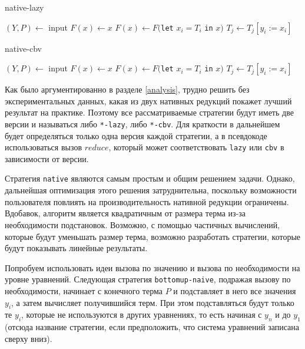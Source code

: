 \documentclass[../diploma.tex]{subfiles}
\begin{document}
\begin{megaalgorithm}
    \caption{native-lazy}
  \begin{algorithmic}
    \State $(Y, P)\gets$ input
    \State $F(x) \gets x$
        \State $F(x) \gets F($\texttt{let} $x_i = T_i$ \texttt{in} $x)$
            \State $T_j \gets T_j[y_i := x_i]$
        \EndFor
    \EndFor
    \State {}
  \end{algorithmic}
\end{megaalgorithm}  

\begin{megaalgorithm}
    \caption{native-cbv}
  \begin{algorithmic}
    \State $(Y, P)\gets$ input
    \State $F(x) \gets x$
        \State $F(x) \gets F($\texttt{let} $x_i = T_i$ \texttt{in} $x)$
            \State $T_j \gets T_j[y_i := x_i]$
        \EndFor
    \EndFor
    \State \Return {\textcolor{red}{$cbv(F(P))$}}
  \end{algorithmic}
\end{megaalgorithm}

Как было аргументированно в разделе \ref{analysis}, трудно решить без экспериментальных данных, какая из двух нативных редукций покажет лучший результат на практике. Поэтому все рассматриваемые стратегии будут иметь две версии и называться либо \texttt{*-lazy}, либо \texttt{*-cbv}. Для краткости в дальнейшем будет определяться только одна версия каждой стратегии, а в псевдокоде использоваться вызов $reduce$, который может соответствовать \texttt{lazy} или  \texttt{cbv} в зависимости от версии.

Стратегия \texttt{native} являются самым простым и общим решением задачи. Однако, дальнейшая оптимизация этого решения затруднительна, поскольку возможности пользователя повлиять на производительность нативной редукции ограничены. Вдобавок, алгоритм является квадратичным от размера терма из-за необходимости подстановок. Возможно, с помощью частичных вычислений, которые будут уменьшать размер терма, возможно разработать стратегии, которые будут показывать линейные результаты.

Попробуем использовать идеи вызова по значению и вызова по необходимости на уровне уравнений. Следующая стратегия \texttt{bottomup-naive}, подражая вызову по необходимости, начинает с конечного терма $P$ и подставляет в него все значения $y_i$, а затем вычисляет получившийся терм. При этом подставляться будут только те $y_i$, которые не используются в других уравнениях, то есть начиная с $y_n$ и до $y_1$ (отсюда название стратегии, если предположить, что система уравнений записана сверху вниз). 
\end{document}
